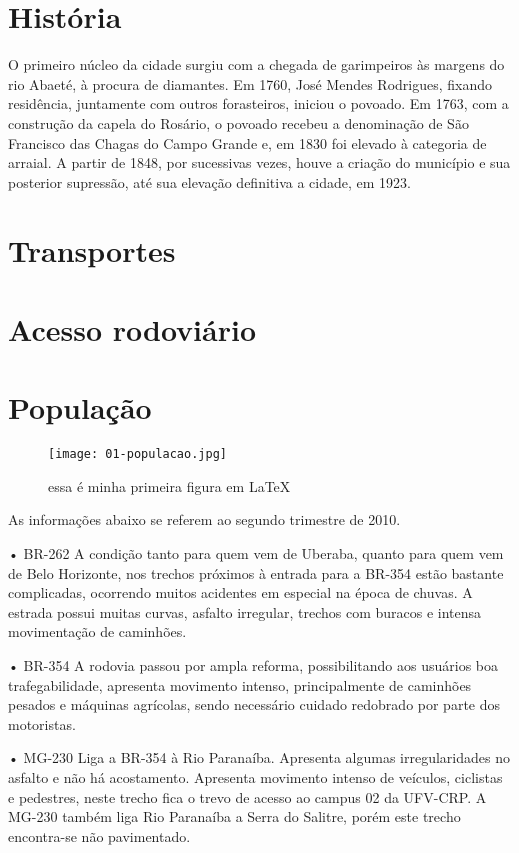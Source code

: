 \documentclass[
	12pt,				    %
	openright,			    %
	oneside,			    %
	a4paper,			    %
    sumario=tradicional,    %
	english,			    %
	brazil,				    %
	]{abntex2}              %
\begin{document}
\section{História}

O primeiro núcleo da cidade surgiu com a chegada de garimpeiros às margens do rio Abaeté, à procura de diamantes. Em 1760, José Mendes Rodrigues, fixando residência, juntamente com outros forasteiros, iniciou o povoado. Em 1763, com a construção da capela do Rosário, o povoado recebeu a denominação de São Francisco das Chagas do Campo Grande e, em 1830 foi elevado à categoria de arraial. A partir de 1848, por sucessivas vezes, houve a criação do município e sua posterior supressão, até sua elevação definitiva a cidade, em 1923.

\section{Transportes}

\section{Acesso rodoviário}

\section{População}

\begin{figure}[htbp]
    \centering
    \texttt{[image: 01-populacao.jpg]}
    \caption{essa é minha primeira figura em \LaTeX}
    \label{fig:População}
\end{figure}

As informações abaixo se referem ao segundo trimestre de 2010.

•	BR-262
A condição tanto para quem vem de Uberaba, quanto para quem vem de Belo Horizonte, nos trechos próximos à entrada para a BR-354 estão bastante complicadas, ocorrendo muitos acidentes em especial na época de chuvas. A estrada possui muitas curvas, asfalto irregular, trechos com buracos e intensa movimentação de caminhões.

•	BR-354
A rodovia passou por ampla reforma, possibilitando aos usuários boa trafegabilidade, apresenta movimento intenso, principalmente de caminhões pesados e máquinas agrícolas, sendo necessário cuidado redobrado por parte dos motoristas.

•	MG-230
Liga a BR-354 à Rio Paranaíba. Apresenta algumas irregularidades no asfalto e não há acostamento. Apresenta movimento intenso de veículos, ciclistas e pedestres, neste trecho fica o trevo de acesso ao campus 02 da UFV-CRP. A MG-230 também liga Rio Paranaíba a Serra do Salitre, porém este trecho encontra-se não pavimentado.
\end{document}
